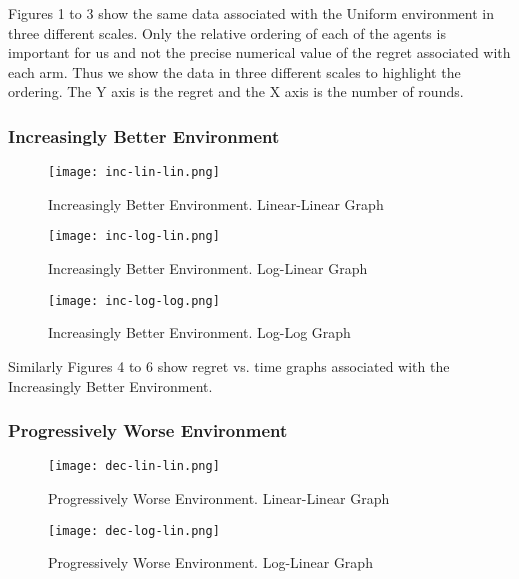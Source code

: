 Figures 1 to 3 show the same data associated with the Uniform environment in three different scales. Only the relative ordering of each of the agents is important for us and not the precise numerical value of the regret associated with each arm. Thus we show the data in three different scales to highlight the ordering. The Y axis is the regret and the X axis is the number of rounds.

\subsubsection{Increasingly Better Environment}

\begin{figure}[ht]
    \centering
    \texttt{[image: inc-lin-lin.png]}
    \caption{Increasingly Better Environment. Linear-Linear Graph}
    \label{fig:i1}
\end{figure}

\begin{figure}[h!]
    \centering
    \texttt{[image: inc-log-lin.png]}
    \caption{Increasingly Better Environment. Log-Linear Graph}
    \label{fig:i2}
\end{figure}

\begin{figure}[h!]
    \centering
    \texttt{[image: inc-log-log.png]}
    \caption{Increasingly Better Environment. Log-Log Graph}
    \label{fig:i3}
\end{figure}

Similarly Figures 4 to 6 show regret vs. time graphs associated with the Increasingly Better Environment. 

\subsubsection{Progressively Worse Environment}

\begin{figure}[ht]
    \centering
    \texttt{[image: dec-lin-lin.png]}
    \caption{Progressively Worse Environment. Linear-Linear Graph}
    \label{fig:d1}
\end{figure}

\begin{figure}[h!]
    \centering
    \texttt{[image: dec-log-lin.png]}
    \caption{Progressively Worse Environment. Log-Linear Graph}
    \label{fig:d2}
\end{figure}

